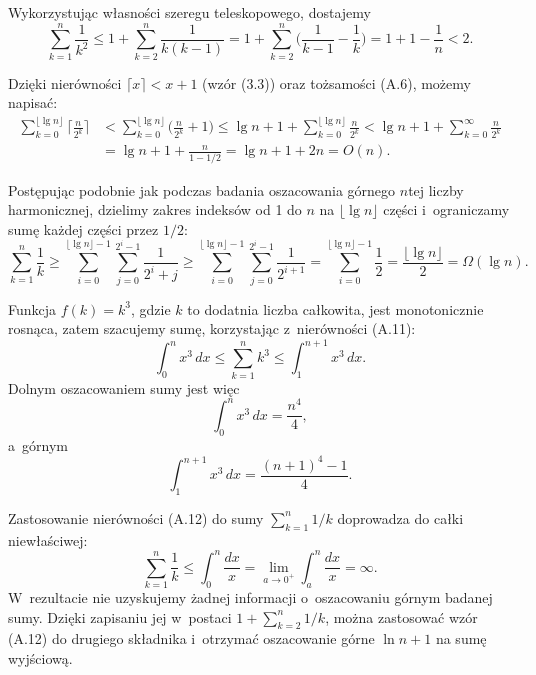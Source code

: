 
\exercise %
Wykorzystując własności szeregu teleskopowego, dostajemy
\[
	\sum_{k=1}^n\frac{1}{k^2} \le 1+\sum_{k=2}^n\frac{1}{k(k-1)} = 1+\sum_{k=2}^n\biggl(\frac{1}{k-1}-\frac{1}{k}\biggr) = 1+1-\frac{1}{n} < 2.
\]

\exercise %
Dzięki nierówności $\lceil x\rceil<x+1$ (wzór (3.3)) oraz tożsamości (A.6), możemy napisać:
\begin{align*}
	\sum_{k=0}^{\lfloor\lg n\rfloor}\biggl\lceil\frac{n}{2^k}\biggr\rceil &< \sum_{k=0}^{\lfloor\lg n\rfloor}\biggl(\frac{n}{2^k}+1\biggr) \le \lg n+1+\sum_{k=0}^{\lfloor\lg n\rfloor}\frac{n}{2^k} < \lg n+1+\sum_{k=0}^\infty\frac{n}{2^k} \\[2mm]
	&= \lg n+1+\frac{n}{1-1/2} = \lg n+1+2n = O(n).
\end{align*}

\exercise %
Postępując podobnie jak podczas badania oszacowania górnego $n$\nbhyphen tej liczby harmonicznej, dzielimy zakres indeksów od 1 do $n$ na $\lfloor\lg n\rfloor$ części i~ograniczamy sumę każdej części przez $1/2$:
\[
    \sum_{k=1}^n\frac{1}{k} \ge \sum_{i=0}^{\lfloor\lg n\rfloor-1}\sum_{j=0}^{2^i-1}\frac{1}{2^i+j} \ge \sum_{i=0}^{\lfloor\lg n\rfloor-1}\sum_{j=0}^{2^i-1}\frac{1}{2^{i+1}} = \sum_{i=0}^{\lfloor\lg n\rfloor-1}\frac{1}{2} = \frac{\lfloor\lg n\rfloor}{2} = \Omega(\lg n).
\]

\exercise %
Funkcja $f(k)=k^3$, gdzie $k$ to dodatnia liczba całkowita, jest monotonicznie rosnąca, zatem szacujemy sumę, korzystając z~nierówności (A.11):
\[
	\int_0^nx^3\,dx \le \sum_{k=1}^nk^3 \le \int_1^{n+1}x^3\,dx.
\]
Dolnym oszacowaniem sumy jest więc
\[
	\int_0^nx^3\,dx = \frac{n^4}{4},
\]
a~górnym
\[
	\int_1^{n+1}x^3\,dx = \frac{(n+1)^4-1}{4}.
\]

\exercise %
Zastosowanie nierówności (A.12) do sumy $\sum_{k=1}^n1/k$ doprowadza do całki niewłaściwej:
\[
	\sum_{k=1}^n\frac{1}{k} \le \int_0^n\frac{dx}{x} = \lim_{a\to0^+}\int_a^n\frac{dx}{x} = \infty.
\]
W~rezultacie nie uzyskujemy żadnej informacji o~oszacowaniu górnym badanej sumy.
Dzięki zapisaniu jej w~postaci $1+\sum_{k=2}^n1/k$, można zastosować wzór (A.12) do drugiego składnika i~otrzymać oszacowanie górne $\ln n+1$ na sumę wyjściową.
